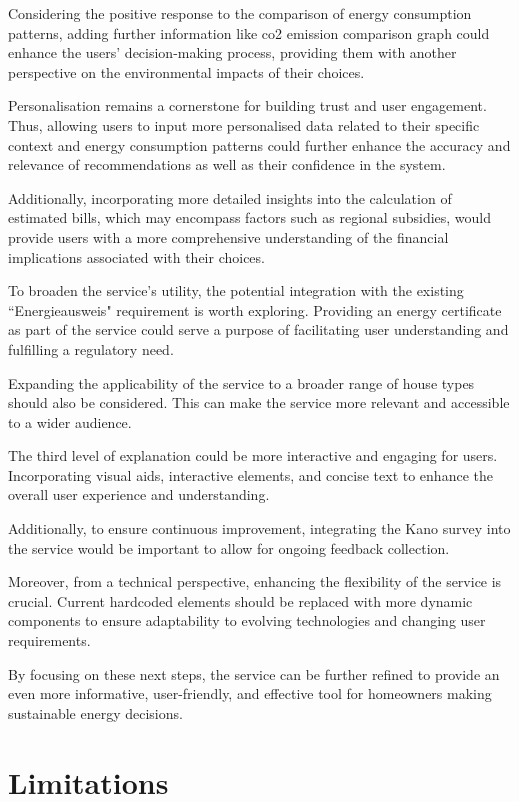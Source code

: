 Considering the positive response to the comparison of energy consumption patterns, adding further information like \gls{co2} emission comparison graph could enhance the users' decision-making process, providing them with another perspective on the environmental impacts of their choices.

Personalisation remains a cornerstone for building trust and user engagement. 
Thus, allowing users to input more personalised data related to their specific context and energy consumption patterns could further enhance the accuracy and relevance of recommendations as well as their confidence in the system.

Additionally, incorporating more detailed insights into the calculation of estimated bills, which may encompass factors such as regional subsidies, would provide users with a more comprehensive understanding of the financial implications associated with their choices.

To broaden the service's utility, the potential integration with the existing ``Energieausweis" requirement is worth exploring. 
Providing an energy certificate as part of the service could serve a purpose of facilitating user understanding and fulfilling a regulatory need.

Expanding the applicability of the service to a broader range of house types should also be considered. 
This can make the service more relevant and accessible to a wider audience. 

The third level of explanation could be more interactive and engaging for users. 
Incorporating visual aids, interactive elements, and concise text to enhance the overall user experience and understanding.

Additionally, to ensure continuous improvement, integrating the Kano survey into the service would be important to allow for ongoing feedback collection. 

Moreover, from a technical perspective, enhancing the flexibility of the service is crucial. 
Current hardcoded elements should be replaced with more dynamic components to ensure adaptability to evolving technologies and changing user requirements. 

By focusing on these next steps, the service can be further refined to provide an even more informative, user-friendly, and effective tool for homeowners making sustainable energy decisions.


\section{Limitations}

